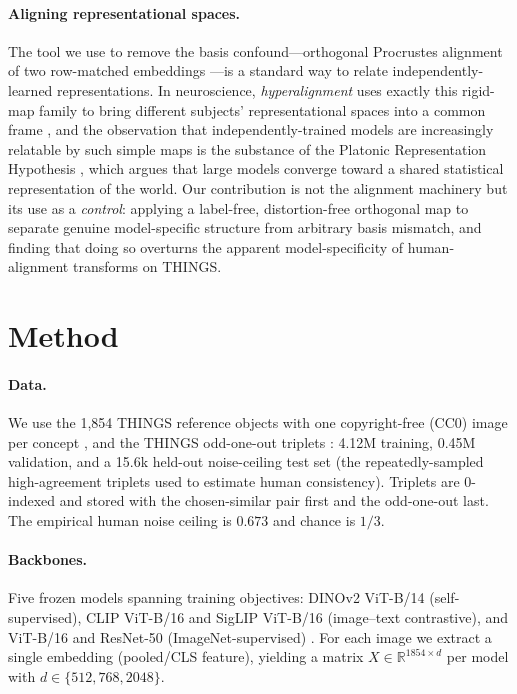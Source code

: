 \documentclass{article}
\begin{document}
\paragraph{Aligning representational spaces.} The tool we use to remove the basis
confound---orthogonal Procrustes alignment of two row-matched embeddings
\citep{schonemann1966procrustes}---is a standard way to relate independently-learned
representations. In neuroscience, \emph{hyperalignment} uses exactly this rigid-map
family to bring different subjects' representational spaces into a common frame
\citep{haxby2011hyperalignment}, and the observation that independently-trained models
are increasingly relatable by such simple maps is the substance of the Platonic
Representation Hypothesis \citep{huh2024platonic}, which argues that large models
converge toward a shared statistical representation of the world. Our contribution is
not the alignment machinery but its use as a \emph{control}: applying a label-free,
distortion-free orthogonal map to separate genuine model-specific structure from
arbitrary basis mismatch, and finding that doing so overturns the apparent
model-specificity of human-alignment transforms on THINGS.

\section{Method}\label{sec:method}

\paragraph{Data.} We use the 1{,}854 THINGS reference objects with one
copyright-free (CC0) image per concept \citep{stoinski2024thingsplus}, and the
THINGS odd-one-out triplets \citep{hebart2023things}: 4.12M training, 0.45M
validation, and a 15.6k held-out noise-ceiling test set (the repeatedly-sampled
high-agreement triplets used to estimate human consistency). Triplets are
0-indexed and stored with the chosen-similar pair first and the odd-one-out last.
The empirical human noise ceiling is $0.673$ and chance is $1/3$.

\paragraph{Backbones.} Five frozen models spanning training objectives: DINOv2
ViT-B/14 (self-supervised), CLIP ViT-B/16 and SigLIP ViT-B/16 (image--text
contrastive), and ViT-B/16 and ResNet-50 (ImageNet-supervised)
\citep{oquab2024dinov2,radford2021clip,zhai2023siglip,dosovitskiy2021vit,he2016resnet}.
For each image we extract a single embedding (pooled/CLS feature), yielding a
matrix $X\in\mathbb{R}^{1854\times d}$ per model with $d\in\{512,768,2048\}$.
\end{document}
